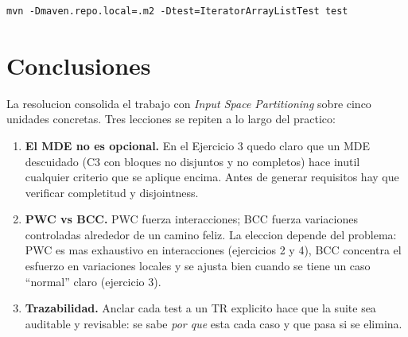 \documentclass[12pt,a4paper]{article}
\begin{document}
\begin{lstlisting}[style=codestyle]
mvn -Dmaven.repo.local=.m2 -Dtest=IteratorArrayListTest test
\end{lstlisting}

\section*{Conclusiones}

La resolucion consolida el trabajo con \textit{Input Space Partitioning} sobre cinco unidades
concretas. Tres lecciones se repiten a lo largo del practico:

\begin{enumerate}
  \item \textbf{El MDE no es opcional.} En el Ejercicio 3 quedo claro que un MDE descuidado (C3
  con bloques no disjuntos y no completos) hace inutil cualquier criterio que se aplique encima.
  Antes de generar requisitos hay que verificar completitud y disjointness.

  \item \textbf{PWC vs BCC.} PWC fuerza interacciones; BCC fuerza variaciones controladas
  alrededor de un camino feliz. La eleccion depende del problema: PWC es mas exhaustivo en
  interacciones (ejercicios 2 y 4), BCC concentra el esfuerzo en variaciones locales y se ajusta
  bien cuando se tiene un caso ``normal'' claro (ejercicio 3).

  \item \textbf{Trazabilidad.} Anclar cada test a un TR explicito hace que la suite sea auditable
  y revisable: se sabe \textit{por que} esta cada caso y que pasa si se elimina.
\end{enumerate}
\end{document}
